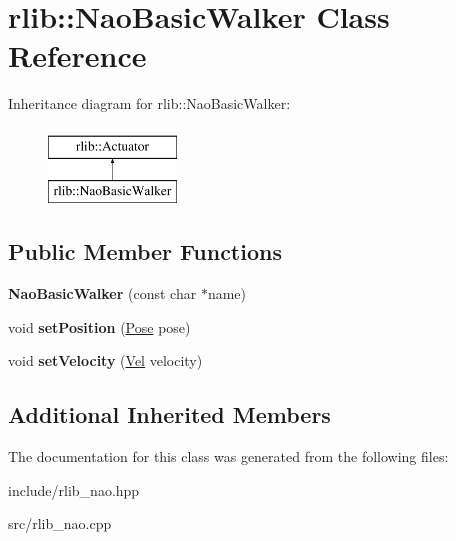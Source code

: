 \hypertarget{classrlib_1_1NaoBasicWalker}{\section{rlib\-:\-:Nao\-Basic\-Walker Class Reference}
\label{classrlib_1_1NaoBasicWalker}
}
Inheritance diagram for rlib\-:\-:Nao\-Basic\-Walker\-:\begin{figure}[H]
\begin{center}
\leavevmode
\includegraphics[height=2.000000cm]{classrlib_1_1NaoBasicWalker}
\end{center}
\end{figure}
\subsection*{Public Member Functions}
\begin{DoxyCompactItemize}
\item 
\hypertarget{classrlib_1_1NaoBasicWalker_a43bdf705d8aeb9cdd8638cee899303b3}{{\bfseries Nao\-Basic\-Walker} (const char $\ast$name)}\label{classrlib_1_1NaoBasicWalker_a43bdf705d8aeb9cdd8638cee899303b3}

\item 
\hypertarget{classrlib_1_1NaoBasicWalker_a282dc6e13898cb72b01fbf5b133efeed}{void {\bfseries set\-Position} (\hyperlink{classrlib_1_1Pose}{Pose} pose)}\label{classrlib_1_1NaoBasicWalker_a282dc6e13898cb72b01fbf5b133efeed}

\item 
\hypertarget{classrlib_1_1NaoBasicWalker_adb9b1a9c71e0558ba57384f6b8385e1a}{void {\bfseries set\-Velocity} (\hyperlink{classrlib_1_1Vel}{Vel} velocity)}\label{classrlib_1_1NaoBasicWalker_adb9b1a9c71e0558ba57384f6b8385e1a}

\end{DoxyCompactItemize}
\subsection*{Additional Inherited Members}


The documentation for this class was generated from the following files\-:\begin{DoxyCompactItemize}
\item 
include/rlib\-\_\-nao.\-hpp\item 
src/rlib\-\_\-nao.\-cpp\end{DoxyCompactItemize}
